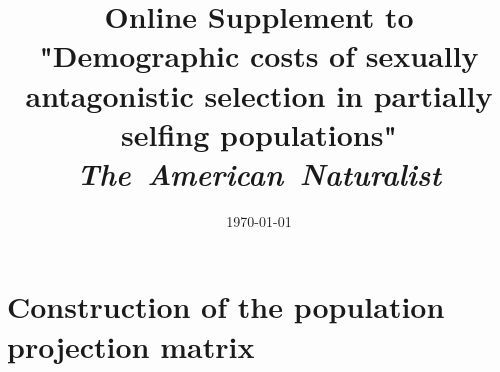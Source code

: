 \documentclass[11pt]{article}
\title{Online Supplement to "Demographic costs of sexually antagonistic selection in partially selfing populations" \\ 
\textit{The~American~Naturalist} }
\date{\today}
\begin{document}
\maketitle






% 
%
%

\renewcommand{\theequation}{S\arabic{equation}}
\renewcommand{\thetable}{S\arabic{table}}
\renewcommand{\thesection}{Supplement~\arabic{section}}
\renewcommand{\thefigure}{S\arabic{figure}}
\setcounter{equation}{0}  %
\setcounter{figure}{0}
\setcounter{table}{0}


\newpage{}
\section{Construction of the population projection matrix}
\end{document}
